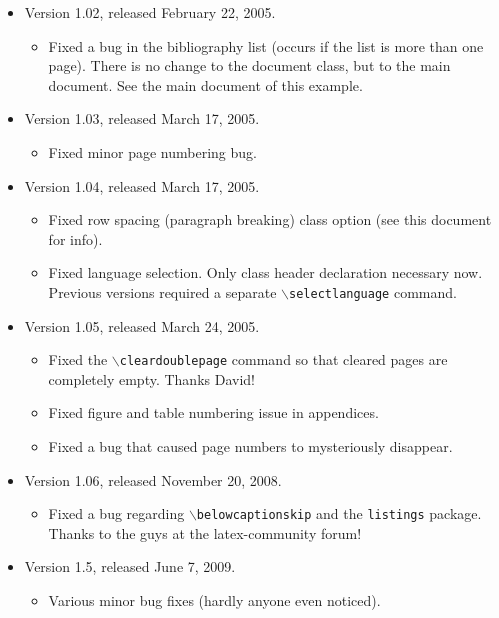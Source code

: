 \begin{itemize}
    \item Version 1.02, released February 22, 2005.
    \begin{itemize}
        \item Fixed a bug in the bibliography list (occurs if the list is more than one page). There is no
        change to the document class, but to the main document. See
        the main document of this example.
    \end{itemize}
    \item Version 1.03, released March 17, 2005.
    \begin{itemize}
        \item Fixed minor page numbering bug.
    \end{itemize}
    \item Version 1.04, released March 17, 2005.
    \begin{itemize}
        \item Fixed row spacing (paragraph breaking) class option
        (see this document for info).
        \item Fixed language selection. Only class header
        declaration necessary now. Previous versions required a
        separate \texttt{$\backslash$selectlanguage} command.
    \end{itemize}
    \item Version 1.05, released March 24, 2005.
    \begin{itemize}
        \item Fixed the \texttt{$\backslash$cleardoublepage} command so that cleared
        pages are completely empty. Thanks David!
        \item Fixed figure and table numbering issue in appendices.
        \item Fixed a bug that caused page numbers to mysteriously
        disappear. 
    \end{itemize}
	 \item Version 1.06, released November 20, 2008.
	 \begin{itemize}
		  \item Fixed a bug regarding \texttt{$\backslash$belowcaptionskip} and 
			the \texttt{listings} package. Thanks to the guys at the latex-community forum!
	 \end{itemize}
	 \item Version 1.5, released June 7, 2009.
    \begin{itemize}
        \item Various minor bug fixes (hardly anyone even noticed). 

\end{itemize}
\end{itemize}
